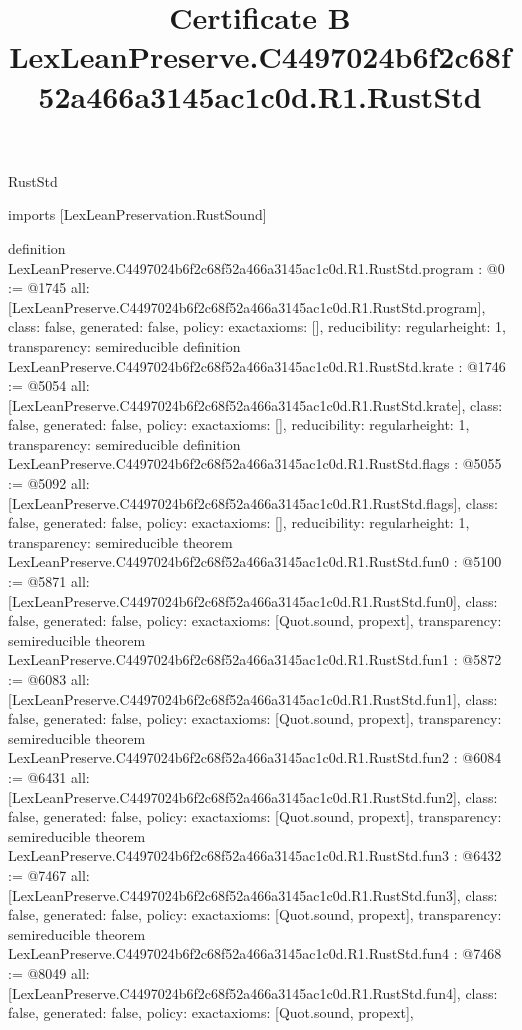 \begin{lexlean}{RustStd}
\title{Certificate B LexLeanPreserve.C4497024b6f2c68f52a466a3145ac1c0d.R1.RustStd}
\begin{coremodule}
imports [LexLeanPreservation.RustSound]

definition LexLeanPreserve.C4497024b6f2c68f52a466a3145ac1c0d.R1.RustStd.program : @0 := @1745 {
  all: [LexLeanPreserve.C4497024b6f2c68f52a466a3145ac1c0d.R1.RustStd.program],
  class: false,
  generated: false,
  policy: exact{axioms: []},
  reducibility: regular{height: 1},
  transparency: semireducible
}
definition LexLeanPreserve.C4497024b6f2c68f52a466a3145ac1c0d.R1.RustStd.krate : @1746 := @5054 {
  all: [LexLeanPreserve.C4497024b6f2c68f52a466a3145ac1c0d.R1.RustStd.krate],
  class: false,
  generated: false,
  policy: exact{axioms: []},
  reducibility: regular{height: 1},
  transparency: semireducible
}
definition LexLeanPreserve.C4497024b6f2c68f52a466a3145ac1c0d.R1.RustStd.flags : @5055 := @5092 {
  all: [LexLeanPreserve.C4497024b6f2c68f52a466a3145ac1c0d.R1.RustStd.flags],
  class: false,
  generated: false,
  policy: exact{axioms: []},
  reducibility: regular{height: 1},
  transparency: semireducible
}
theorem LexLeanPreserve.C4497024b6f2c68f52a466a3145ac1c0d.R1.RustStd.fun0 : @5100 := @5871 {
  all: [LexLeanPreserve.C4497024b6f2c68f52a466a3145ac1c0d.R1.RustStd.fun0],
  class: false,
  generated: false,
  policy: exact{axioms: [Quot.sound, propext]},
  transparency: semireducible
}
theorem LexLeanPreserve.C4497024b6f2c68f52a466a3145ac1c0d.R1.RustStd.fun1 : @5872 := @6083 {
  all: [LexLeanPreserve.C4497024b6f2c68f52a466a3145ac1c0d.R1.RustStd.fun1],
  class: false,
  generated: false,
  policy: exact{axioms: [Quot.sound, propext]},
  transparency: semireducible
}
theorem LexLeanPreserve.C4497024b6f2c68f52a466a3145ac1c0d.R1.RustStd.fun2 : @6084 := @6431 {
  all: [LexLeanPreserve.C4497024b6f2c68f52a466a3145ac1c0d.R1.RustStd.fun2],
  class: false,
  generated: false,
  policy: exact{axioms: [Quot.sound, propext]},
  transparency: semireducible
}
theorem LexLeanPreserve.C4497024b6f2c68f52a466a3145ac1c0d.R1.RustStd.fun3 : @6432 := @7467 {
  all: [LexLeanPreserve.C4497024b6f2c68f52a466a3145ac1c0d.R1.RustStd.fun3],
  class: false,
  generated: false,
  policy: exact{axioms: [Quot.sound, propext]},
  transparency: semireducible
}
theorem LexLeanPreserve.C4497024b6f2c68f52a466a3145ac1c0d.R1.RustStd.fun4 : @7468 := @8049 {
  all: [LexLeanPreserve.C4497024b6f2c68f52a466a3145ac1c0d.R1.RustStd.fun4],
  class: false,
  generated: false,
  policy: exact{axioms: [Quot.sound, propext]},
}
\end{coremodule}
\end{lexlean}
